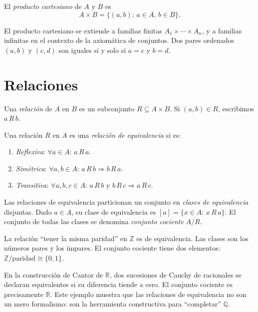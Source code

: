 \begin{definition}
\label{def:producto-cartesiano}
El \emph{producto cartesiano} de $A$ y $B$ es
\[
  A\times B=\{(a,b):\,a\in A,\,b\in B\}.
\]
\end{definition}

El producto cartesiano se extiende a familias finitas $A_1\times\cdots\times A_n$, y a familias infinitas en el contexto de la axiomática de conjuntos. Dos pares ordenados $(a,b)$ y $(c,d)$ son iguales si y solo si $a=c$ y $b=d$.

\section{Relaciones}

\begin{definition}
\label{def:relacion}
Una \emph{relación} de $A$ en $B$ es un subconjunto $R\subseteq A\times B$. Si $(a,b)\in R$, escribimos $a\,R\,b$.
\end{definition}

\begin{definition}
\label{def:relacion-equivalencia}
Una relación $R$ en $A$ es una \emph{relación de equivalencia} si es:
\begin{enumerate}
  \item[(i)] \emph{Reflexiva}: $\forall a\in A:\,a\,R\,a$.
  \item[(ii)] \emph{Simétrica}: $\forall a,b\in A:\,a\,R\,b\Rightarrow b\,R\,a$.
  \item[(iii)] \emph{Transitiva}: $\forall a,b,c\in A:\,a\,R\,b\text{ y }b\,R\,c\Rightarrow a\,R\,c$.
\end{enumerate}
\end{definition}

Las relaciones de equivalencia particionan un conjunto en \emph{clases de equivalencia} disjuntas. Dado $a\in A$, su clase de equivalencia es $[a]=\{x\in A:\,x\,R\,a\}$. El conjunto de todas las clases se denomina \emph{conjunto cociente} $A/R$.

\begin{example}
La relación ``tener la misma paridad'' en $\mathbb{Z}$ es de equivalencia. Las clases son los números pares y los impares. El conjunto cociente tiene dos elementos: $\mathbb{Z}/\text{paridad}\cong\{0,1\}$.
\end{example}

\begin{example}
En la construcción de Cantor de $\mathbb{R}$, dos sucesiones de Cauchy de racionales se declaran equivalentes si su diferencia tiende a cero. El conjunto cociente es precisamente $\mathbb{R}$. Este ejemplo muestra que las relaciones de equivalencia no son un mero formalismo: son la herramienta constructiva para ``completar'' $\mathbb{Q}$.
\end{example}

